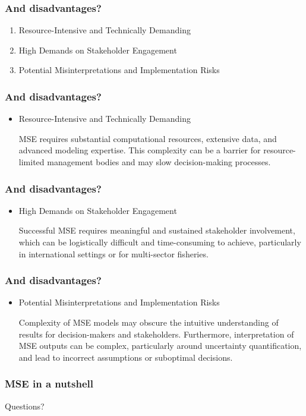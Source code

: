 \documentclass{beamer}
\begin{document}
\begin{frame}
\frametitle{And disadvantages?}

\begin{enumerate}
	\item Resource-Intensive and Technically Demanding
	\item High Demands on Stakeholder Engagement
	\item Potential Misinterpretations and Implementation Risks
\end{enumerate}

\end{frame}


\begin{frame}
	\frametitle{And disadvantages?}
	
	\begin{itemize}	
		\item Resource-Intensive and Technically Demanding \\
		
		\bigskip
		
		MSE requires substantial computational resources, extensive data, and advanced modeling expertise. This complexity can be a barrier for resource-limited management bodies and may slow decision-making processes.

	\end{itemize}	
\end{frame}

\begin{frame}
	\frametitle{And disadvantages?}
	
	\begin{itemize}	
		\item High Demands on Stakeholder Engagement \\
		
		\bigskip
		
		Successful MSE requires meaningful and sustained stakeholder involvement, which can be logistically difficult and time-consuming to achieve, particularly in international settings or for multi-sector fisheries.

	\end{itemize}	
\end{frame}

\begin{frame}
	\frametitle{And disadvantages?}
	
	\begin{itemize}	
		\item Potential Misinterpretations and Implementation Risks \\
		
		\bigskip
		
		Complexity of MSE models may obscure the intuitive understanding of results for decision-makers and stakeholders. Furthermore, interpretation of MSE outputs can be complex, particularly around uncertainty quantification, and lead to incorrect assumptions or suboptimal decisions. 
		
		
	\end{itemize}	
\end{frame}

\begin{frame}
	\frametitle{MSE in a nutshell}

\centering Questions?

\end{frame}
\end{document}
